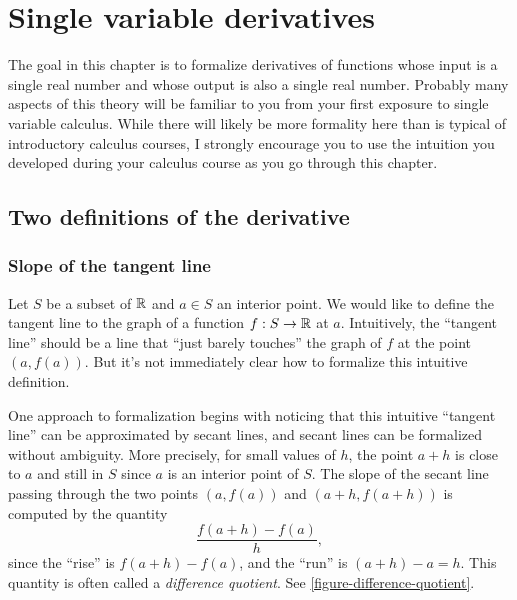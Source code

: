 \chapter{Single variable derivatives} \label{single}

The goal in this chapter is to formalize derivatives of functions whose input is a single real number and whose output is also a single real number. Probably many aspects of this theory will be familiar to you from your first exposure to single variable calculus. While there will likely be more formality here than is typical of introductory calculus courses, I strongly encourage you to use the intuition you developed during your calculus course as you go through this chapter. 

\section{Two definitions of the derivative}

\subsection{Slope of the tangent line} \label{slope-of-tangent-line}

Let $S$ be a subset of $\mathbb{R}$ and $a \in S$ an interior point. We would like to define the tangent line to the graph of a function $f : S \to \mathbb{R}$ at $a$. Intuitively, the ``tangent line'' should be a line that ``just barely touches'' the graph of $f$ at the point $(a, f(a))$. But it's not immediately clear how to formalize this intuitive definition.  

One approach to formalization begins with noticing that this intuitive ``tangent line'' can be approximated by secant lines, and secant lines can be formalized without ambiguity. More precisely, for small values of $h$, the point $a+h$ is close to $a$ and still in $S$ since $a$ is an interior point of $S$. The slope of the secant line passing through the two points $(a, f(a))$ and $(a+h, f(a+h))$ is computed by the quantity
\[ \frac{f(a+h)-f(a)}{h}, \]
since the ``rise'' is $f(a+h)-f(a)$, and the ``run'' is $(a+h)-a = h$. This quantity is often called a \emph{difference quotient}. See \cref{figure-difference-quotient}. 

